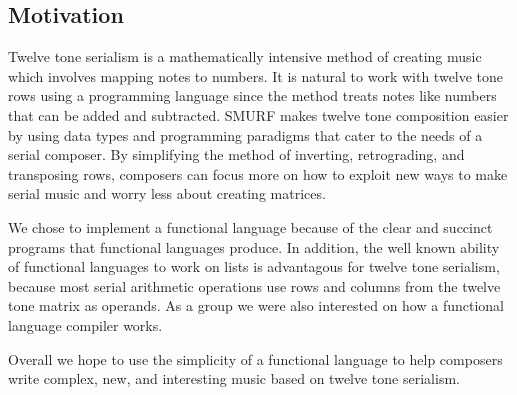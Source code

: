 \subsection{Motivation}

Twelve tone serialism is a mathematically intensive method of creating music which 
involves mapping notes to numbers. It is natural to work with twelve tone rows 
using a programming language since the method treats notes like numbers that 
can be added and subtracted. SMURF makes twelve tone composition 
easier by using data types and programming paradigms that cater to the needs of a serial composer.
By simplifying the method of inverting, retrograding, and transposing rows, composers can focus 
more on how to exploit new ways to make serial music and worry less about 
creating matrices. 

We chose to implement a functional language because of the clear and 
succinct programs that functional languages produce. In addition, the well known ability
of functional languages to work on lists is advantagous for twelve tone serialism, because
most serial arithmetic operations use rows and columns from the twelve tone matrix as operands. 
As a group we were also interested on how a functional language compiler works. 

Overall we hope to use the simplicity of a functional language to help composers write 
complex, new, and interesting music based on twelve tone serialism. 
